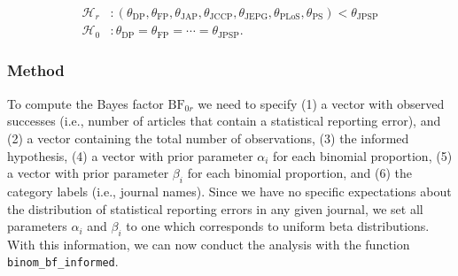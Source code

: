 \documentclass[
  english,
  man,floatsintext]{apa6}
\begin{document}
\begin{align*}
    \mathcal{H}_r &: (\theta_{\text{DP}}, \theta_{\text{FP}}, \theta_{\text{JAP}} , \theta_{\text{JCCP}} , \theta_{\text{JEPG}} , \theta_{\text{PLoS}}, \theta_{\text{PS}}) < \theta_{\text{JPSP}} \\
    \mathcal{H}_0 &: \theta_{\text{DP}} =  \theta_{\text{FP}} =  \cdots = \theta_{\text{JPSP}}.
\end{align*}

\hypertarget{method-1}{%
\subsubsection{Method}\label{method-1}}

To compute the Bayes factor \(\text{BF}_{0r}\) we need to specify (1) a vector with observed successes (i.e., number of articles that contain a statistical reporting error), and (2) a vector containing the total number of observations, (3) the informed hypothesis, (4) a vector with prior parameter \(\alpha_i\) for each binomial proportion, (5) a vector with prior parameter \(\beta_i\) for each binomial proportion, and (6) the category labels (i.e., journal names). Since we have no specific expectations about the distribution of statistical reporting errors in any given journal, we set all parameters \(\alpha_i\) and \(\beta_i\) to one which corresponds to uniform beta distributions. With this information, we can now conduct the analysis with the function \texttt{binom\_bf\_informed}.
\end{document}
